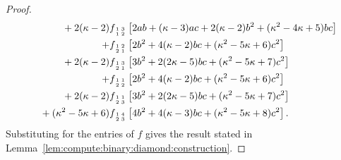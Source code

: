 \documentclass[11pt]{article}
\newcommand{\subMat}[4]{\mbox{\scriptsize $\begin{smallmatrix} #1 & #4 \\ #2 & #3 \end{smallmatrix}$}}
\begin{document}
\begin{proof}
\begin{alignat*}{2}
      &&{}+            2 (\kappa - 2) &f_{\subMat{1}{1}{2}{3}} \left[2 a b + (\kappa - 3) a c + 2 (\kappa - 2) b^2 + (\kappa^2 - 4 \kappa + 5) b c\right]\\
      &&{}+                           &f_{\subMat{1}{2}{1}{2}} \left[2 b^2 + 4 (\kappa - 2) b c + (\kappa^2 - 5 \kappa + 6) c^2\right]\\
      &&{}+            2 (\kappa - 2) &f_{\subMat{1}{2}{1}{3}} \left[3 b^2 + 2 (2 \kappa - 5) b c + (\kappa^2 - 5 \kappa + 7) c^2\right]\\
      &&{}+                           &f_{\subMat{1}{2}{2}{1}} \left[2 b^2 + 4 (\kappa - 2) b c + (\kappa^2 - 5 \kappa + 6) c^2\right]\\
      &&{}+            2 (\kappa - 2) &f_{\subMat{1}{2}{3}{1}} \left[3 b^2 + 2 (2 \kappa - 5) b c + (\kappa^2 - 5 \kappa + 7) c^2\right]\\
      &&{}+ (\kappa^2 - 5 \kappa + 6) &f_{\subMat{1}{2}{3}{4}} \left[4 b^2 + 4 (\kappa - 3) b c + (\kappa^2 - 5 \kappa + 8) c^2\right].
 \end{alignat*}
 Substituting for the entries of $f$ gives the result stated in Lemma~\ref{lem:compute:binary:diamond:construction}.
\end{proof}
\end{document}
